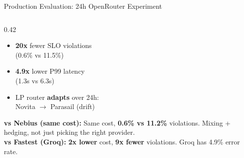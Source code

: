 \documentclass[aspectratio=169,10pt]{beamer}
\begin{document}
\begin{frame}{Production Evaluation: 24h OpenRouter Experiment}
\begin{columns}[T]
\begin{column}{0.42\textwidth}
\vspace{0.2cm}
\begin{itemize}\setlength{\itemsep}{3pt}
    \item \textbf{20x} fewer SLO violations\\
    (0.6\% vs 11.5\%)
    \item \textbf{4.9x} lower P99 latency\\
    (1.3s vs 6.3s)
    \item LP router \textbf{adapts} over 24h:\\
    Novita $\to$ Parasail (drift)
\end{itemize}

\vspace{0.2cm}
\small
\textbf{vs Nebius (same cost):} Same cost, \textbf{0.6\% vs 11.2\%} violations. Mixing + hedging, not just picking the right provider.\\[3pt]
\textbf{vs Fastest (Groq):} \textbf{2x lower} cost, \textbf{9x fewer} violations. Groq has 4.9\% error rate.

\vspace{0.15cm}
\end{column}
\end{columns}
\end{frame}
\end{document}
